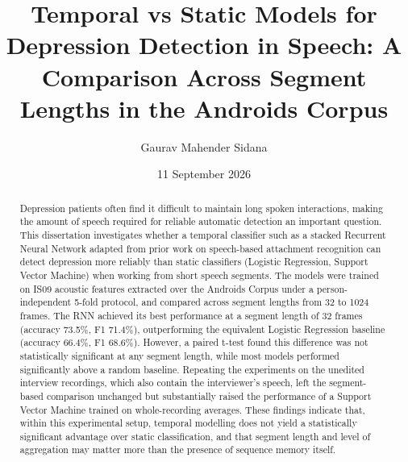\documentclass{mproj}
\begin{document}
\title{Temporal vs Static Models for Depression Detection in Speech: A Comparison Across Segment Lengths in the Androids Corpus}
\author{Gaurav Mahender Sidana}
\date{11 September 2026}
\maketitle

\begin{abstract}
Depression patients often find it difficult to maintain long spoken interactions, making the amount of speech required for reliable automatic detection an important question. This dissertation investigates whether a temporal classifier such as a stacked Recurrent Neural Network adapted from prior work on speech-based attachment recognition can detect depression more reliably than static classifiers (Logistic Regression, Support Vector Machine) when working from short speech segments. The models were trained on IS09 acoustic features extracted over the Androids Corpus under a person-independent 5-fold protocol, and compared across segment lengths from 32 to 1024 frames. The RNN achieved its best performance at a segment length of 32 frames (accuracy 73.5\%, F1 71.4\%), outperforming the equivalent Logistic Regression baseline (accuracy 66.4\%, F1 68.6\%). However, a paired t-test found this difference was not statistically significant at any segment length, while most models performed significantly above a random baseline. Repeating the experiments on the unedited interview recordings, which also contain the interviewer's speech, left the segment-based comparison unchanged but substantially raised the performance of a Support Vector Machine trained on whole-recording averages. These findings indicate that, within this experimental setup, temporal modelling does not yield a statistically significant advantage over static classification, and that segment length and level of aggregation may matter more than the presence of sequence memory itself.
\end{abstract}

\educationalconsent

\end{document}

